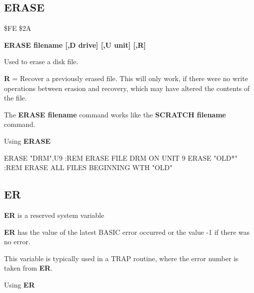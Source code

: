 
\newpage
\subsection{ERASE}
\begin{description}[leftmargin=3cm,style=nextline]
\item [Token:] \$FE \$2A
\item [Format:] {\bf ERASE filename [,D drive] [,U unit] [,R]}
\item [Usage:] Used
               to erase a disk file.

   \filenamedefinition

   \drivedefinition

   \unitdefinition

   {\bf R} = Recover a previously erased file.
   This will only work, if there were no write operations
   between erasion and recovery, which may have altered the
   contents of the file.

\item [Remarks:] The {\bf ERASE filename} command works like the
                 {\bf SCRATCH filename} command.

\item [Example:] Using {\bf ERASE}
\begin{screenoutput}
  ERASE "DRM",U9 :REM ERASE FILE DRM ON UNIT 9
  ERASE "OLD*"   :REM ERASE ALL FILES BEGINNING WTH "OLD"
\end{screenoutput}
\end{description}


\newpage
\subsection{ER}
\begin{description}[leftmargin=3cm,style=nextline]
\item [Format:] {\bf ER} is a reserved system variable
\item [Usage:]  {\bf ER} has the value of the latest BASIC error
               occurred or the value -1 if there was no error.

This variable is typically used in a TRAP routine,
where the error number is taken from {\bf ER}.

\item [Example:] Using {\bf ER}
\end{description}

